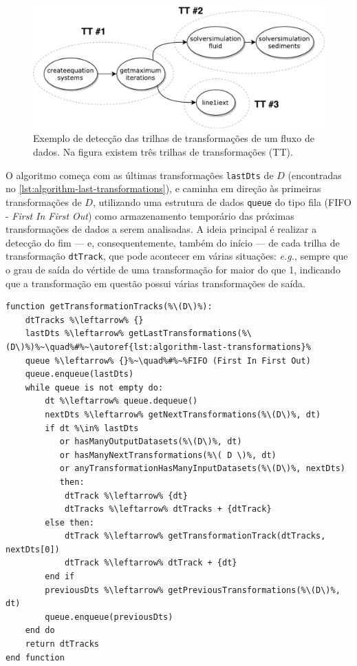 \begin{figure}[htb]
    \centering
    \includegraphics[width=\textwidth]{img/transformation-tracks}
    \caption[Exemplo de detecção das trilhas de transformações.]{Exemplo de detecção das trilhas de transformações de um fluxo de dados. Na figura existem três trilhas de transformações (\textsc{TT}).}%
    \label{fig:transformation-tracks}
\end{figure}

O algoritmo começa com as últimas transformações \texttt{lastDts} de \( D \) (encontradas no \autoref{lst:algorithm-last-transformations}), e caminha em direção às primeiras transformações de \( D \), utilizando uma estrutura de dados \texttt{queue} do tipo fila (FIFO - \textit{First In First Out}) como armazenamento temporário das próximas transformações de dados a serem analisadas. A ideia principal é realizar a detecção do fim --- e, consequentemente, também do início --- de cada trilha de transformação \texttt{dtTrack}, que pode acontecer em várias situações: \textit{e.g.}, sempre que o grau de saída do vértide de uma transformação for maior do que 1, indicando que a transformação em questão possui várias transformações de saída.

\begin{minipage}[c]{0.95\textwidth}
\begin{lstlisting}[language=pseudocode,label={lst:algorithm-transformation-tracks},caption={[Detecção das trilhas de transformações]Detecção do rastro do fluxo de dados no nível de trilhas de transformações.}]
function getTransformationTracks(%\(D\)%):
    dtTracks %\leftarrow% {}
    lastDts %\leftarrow% getLastTransformations(%\(D\)%)%~\quad%#%~\autoref{lst:algorithm-last-transformations}%
    queue %\leftarrow% {}%~\quad%#%~%FIFO (First In First Out)
    queue.enqueue(lastDts)
    while queue is not empty do:
        dt %\leftarrow% queue.dequeue()
        nextDts %\leftarrow% getNextTransformations(%\(D\)%, dt)
        if dt %\in% lastDts
           or hasManyOutputDatasets(%\(D\)%, dt)
           or hasManyNextTransformations(%\( D \)%, dt)
           or anyTransformationHasManyInputDatasets(%\(D\)%, nextDts)
           then:
            dtTrack %\leftarrow% {dt}
            dtTracks %\leftarrow% dtTracks + {dtTrack}
        else then:
            dtTrack %\leftarrow% getTransformationTrack(dtTracks, nextDts[0])
            dtTrack %\leftarrow% dtTrack + {dt}
        end if
        previousDts %\leftarrow% getPreviousTransformations(%\(D\)%, dt)
        queue.enqueue(previousDts)
    end do
    return dtTracks
end function
\end{lstlisting}
\end{minipage}

